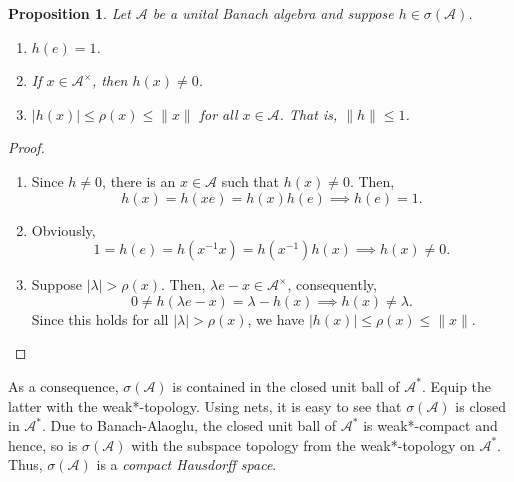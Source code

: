 \documentclass[12pt]{article}
\theoremstyle{thmstyle}
\newtheorem{proposition}[theorem]{Proposition}
\theoremstyle{defstyle}
\newcommand{\calA}{\mathcal{A}} %
\renewcommand{\le}{\leqslant}
\begin{document}
\begin{proposition}
    Let $\calA$ be a unital Banach algebra and suppose $h\in\sigma(\calA)$. 
    \begin{enumerate}[label=(\alph*)]
    \item $h(e) = 1$.
    \item If $x\in\calA^\times$, then $h(x)\ne 0$. 
    \item $|h(x)|\le\rho(x)\le\|x\|$ for all $x\in\calA$. That is, $\|h\|\le 1$.
    \end{enumerate}
\end{proposition}
\begin{proof}
\begin{enumerate}[label=(\alph*)]
    \item Since $h\ne 0$, there is an $x\in\calA$ such that $h(x)\ne 0$. Then, 
    \begin{equation*}
        h(x) = h(xe) = h(x)h(e)\implies h(e) = 1.
    \end{equation*}
    \item Obviously, 
    \begin{equation*}
        1 = h(e) = h(x^{-1}x) = h(x^{-1})h(x)\implies h(x)\ne 0.
    \end{equation*}
    \item Suppose $|\lambda| > \rho(x)$. Then, $\lambda e - x\in\calA^\times$, consequently, 
    \begin{equation*}
        0\ne h(\lambda e - x) = \lambda - h(x)\implies h(x)\ne\lambda.
    \end{equation*}
    Since this holds for all $|\lambda| > \rho(x)$, we have $|h(x)|\le\rho(x)\le\|x\|$.\qedhere
\end{enumerate}
\end{proof}

As a consequence, $\sigma(\calA)$ is contained in the closed unit ball of $\calA^\ast$. Equip the latter with the weak*-topology. Using nets, it is easy to see that $\sigma(\calA)$ is closed in $\calA^\ast$. Due to Banach-Alaoglu, the closed unit ball of $\calA^\ast$ is weak*-compact and hence, so is $\sigma(\calA)$ with the subspace topology from the weak*-topology on $\calA^\ast$. Thus, $\sigma(\calA)$ is a \emph{compact Hausdorff space}.
\end{document}
